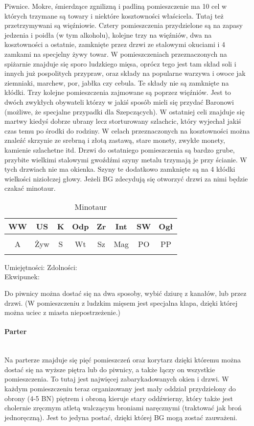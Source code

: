 \documentclass{article}
\newcommand{\whtable}[1]{
    \begin{table}[H]
        \caption{{#1}}
        \vspace{4pt}
        \centering
            \begin{tabular}{|c|c|c|c|c|c|c|c|}
                \hline
                WW & US & K & Odp & Zr & Int & SW & Ogł \\ \hline
                 &  &  &  &  &  &  &  \\ \hline
                A & Żyw & S & Wt & Sz & Mag & PO & PP \\ \hline
                 &  &  &  &  &  &  &  \\ \hline
                \end{tabular}
    \end{table}

    \noindent
    Umiejętności:
    \hspace{150pt}
    Zdolności:
    \vspace{50pt}\\
    Ekwipunek:
    \vspace{50pt}
}
\begin{document}
Piwnice. Mokre, śmierdzące zgnilizną i padliną pomieszczenie ma 10 cel w których trzymane są towary i niektóre kosztowności właścicela. Tutaj też przetrzymywani są więźniowie. Cztery pomieszczenia przydzielone są na zapasy jedzenia i poidła (w tym alkoholu), kolejne trzy na więźniów, dwa na kosztowności a ostatnie, zamknięte przez drzwi ze stalowymi okuciami i 4 zamkami na specjelny żywy towar. W pomieszczeniach przeznaczonych na spiżarnie znajduje się sporo ludzkiego mięsa, oprócz tego jest tam skład soli i innych już pospolitych przypraw, oraz składy na popularne warzywa i owoce jak ziemniaki, marchew, por, jabłka czy cebula. Te składy nie są zamknięte na kłódki. Trzy kolejne pomieszczenia zajmowane są poprzez więźniów. Jest to dwóch zwykłych obywateli którzy w jakiś sposób mieli się przydać Baronowi (możliwe, że specjalne przypadki dla Szepczących). W ostatniej celi znajduje się martwy kiedyś dobrze ubrany lecz storturowany szlachcic, który wyjechał jakiś czas temu po środki do rodziny. W celach przeznaczonych na kosztowności można znaleźć skrzynie ze srebrną i złotą zastawą, stare monety, zwykłe monety, kamienie szlachetne itd. Drzwi do ostatniego pomieszczenia są bardzo grube, przybite wielkimi stalowymi gwoźdźmi szyny metalu trzymają je przy ścianie. W tych drzwiach nie ma okienka. Szyny te dodatkowo zamknięte są na 4 kłódki wielkości niziołczej głowy. Jeżeli BG zdecydują się otworzyć drzwi za nimi będzie czakać minotaur. 

\whtable{Minotaur}

Do piwnicy można dostać się na dwa sposoby, wybić dziurę z kanałów, lub przez drzwi. (W pomieszczeniu z ludzkim mięsem jest specjalna klapa, dzięki której można uciec z miasta niepostrzeżenie.)

\paragraph{\Large{Parter}}\mbox{}\\

Na parterze znajduje się pięć pomieszczeń oraz korytarz dzięki któremu można dostać się na wyższe piętra lub do piwnicy, a także łączy on wszystkie pomieszczenia. To tutaj jest najwięcej zabarykadowanych okien i drzwi. W każdym pomieszczeniu teraz organizowany jest mały oddział przydzielony do obrony (4-5 BN) piętrem i obroną kieruje stary oddźwierny, który także jest cholernie zręcznym atletą walczącym broniami naręcznymi (traktować jak broń jednoręczną). Jest to jedyna postać, dzięki której BG mogą zostać zauważeni. 
\end{document}
